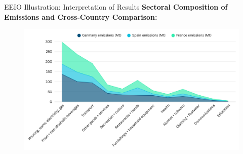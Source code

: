 \documentclass{beamer}
\begin{document}
\begin{frame}{EEIO Illustration: Interpretation of Results}
\footnotesize
\vspace{-2.5em}
\textbf{Sectoral Composition of Emissions and Cross-Country Comparison:}
\pause
\begin{figure}
  \centering
  \includegraphics[width=\linewidth]{Emissions EEIO.png}
\end{figure}
\end{frame}
\end{document}
